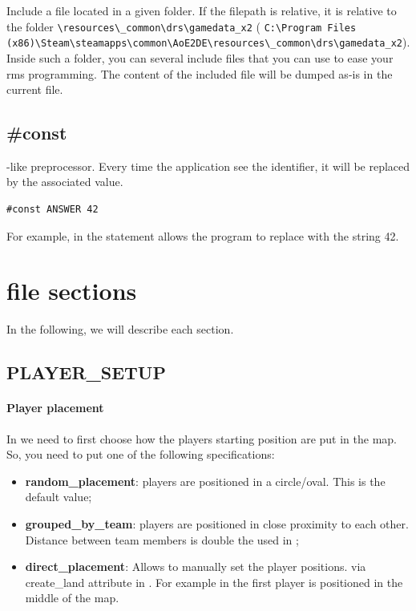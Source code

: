 \begin{appendices}
    Include a file located in a given folder. If the filepath is relative, it is relative to the folder \aoeexedir{}\verb|\resources\_common\drs\gamedata_x2| (\eg{} \verb|C:\Program Files (x86)\Steam\steamapps\common\AoE2DE\resources\_common\drs\gamedata_x2|). Inside such a folder, you can several include files that you can use to ease your rms programming. The content of the included file will be dumped as-is in the current file.

    \subsection{\#const}

    -like preprocessor. Every time the application see the identifier, it will be replaced by the associated value.

    \begin{lstlisting}[language={rms}, label={lst:const}]
        #const ANSWER 42
    \end{lstlisting}

    For example, in  the statement allows the program to replace  with the string 42.

    \section{ file sections}

    In the following, we will describe each section. 

    \subsection{PLAYER\_SETUP}

    \paragraph{Player placement}

    In  we need to first choose how the players starting position are put in the map. So, you need to put one of the following specifications:

    \begin{itemize}
        \item \textbf{random\_placement}: players are positioned in a circle/oval. This is the default value;
        \item \textbf{grouped\_by\_team}: players are positioned in close proximity to each other. Distance between team members is double the  used in ;
        \item \textbf{direct\_placement}: Allows to manually set the player positions. via create\_land attribute in . For example in  the first player is positioned in the middle of the map.
        

\end{itemize}
\end{appendices}
